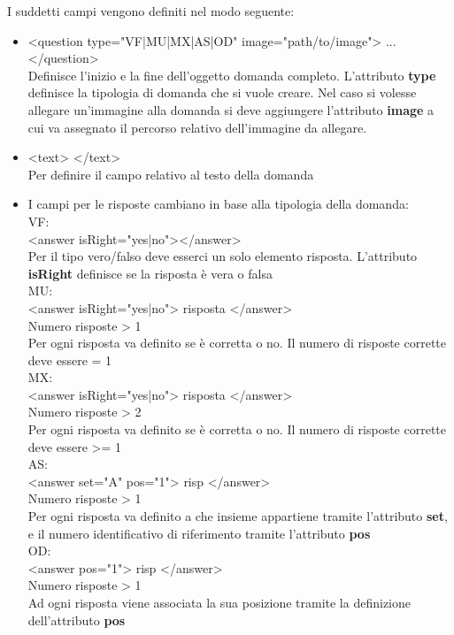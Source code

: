 I suddetti campi vengono definiti nel modo seguente:\\
\begin{itemize}
\item <question type="VF|MU|MX|AS|OD" image="path/to/image"> ... </question> \\

Definisce l'inizio e la fine dell'oggetto domanda completo. L'attributo \textbf{type} definisce la tipologia di domanda che si vuole creare.
Nel caso si volesse allegare un'immagine alla domanda si deve aggiungere l'attributo \textbf{image} a cui va assegnato il percorso relativo dell'immagine da allegare.\\
\item <text> </text>\\
Per definire il campo relativo al testo della domanda
\item I campi per le risposte cambiano in base alla tipologia della domanda:\\

VF:\\
<answer isRight="yes|no"></answer>\\ Per il tipo vero/falso deve esserci un solo elemento risposta. 	L'attributo \textbf{isRight} definisce se la risposta è vera o falsa\\

MU:\\
 <answer isRight="yes|no"> risposta </answer>\\
Numero risposte > 1\\
Per ogni risposta va definito se è corretta o no. Il numero di risposte corrette deve essere = 1\\

		MX:\\
	<answer isRight="yes|no"> risposta </answer>\\
Numero risposte > 2\\
Per ogni risposta va definito se è corretta o no. Il numero di risposte corrette deve essere >= 1\\

		AS:\\
		<answer set="A" pos="1"> risp </answer>\\
Numero risposte > 1\\
Per ogni risposta va definito a che insieme appartiene tramite l'attributo \textbf{set}, e il numero identificativo di riferimento tramite l'attributo \textbf{pos}\\

		OD:\\
		<answer pos="1"> risp </answer>\\
Numero risposte > 1\\
Ad ogni risposta viene associata la sua posizione tramite la definizione dell'attributo \textbf{pos}
\end{itemize}
\newpage

